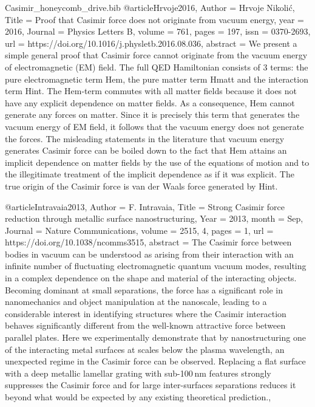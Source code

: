 \documentclass[twoside, 10pt]{article}
\def\myfilename{Casimir_honeycomb_drive}
\begin{document}
\begin{multicols}{2}
\begin{filecontents}{\myfilename.bib}
@article{Hrvoje2016,
    Author = {Hrvoje Nikolić},
    Title = {Proof that Casimir force does not originate from vacuum energy},
    year = {2016},
    Journal = {Physics Letters B},
    volume = {761},
    pages = {197},
    issn = {0370-2693},
    url = {https://doi.org/10.1016/j.physletb.2016.08.036},
    abstract = {We present a simple general proof that Casimir force cannot originate from the vacuum energy of electromagnetic (EM) field. The full QED Hamiltonian consists of 3 terms: the pure electromagnetic term Hem, the pure matter term Hmatt and the interaction term Hint. The Hem-term commutes with all matter fields because it does not have any explicit dependence on matter fields. As a consequence, Hem cannot generate any forces on matter. Since it is precisely this term that generates the vacuum energy of EM field, it follows that the vacuum energy does not generate the forces. The misleading statements in the literature that vacuum energy generates Casimir force can be boiled down to the fact that Hem attains an implicit dependence on matter fields by the use of the equations of motion and to the illegitimate treatment of the implicit dependence as if it was explicit. The true origin of the Casimir force is van der Waals force generated by Hint.}
}




@article{Intravaia2013,
    Author = {F. Intravaia},
    Title = {Strong Casimir force reduction through metallic surface nanostructuring},
    Year = {2013},
    month = {Sep},
    Journal = {Nature Communications},
    volume = {2515, 4},
    pages = {1},
    url = {https://doi.org/10.1038/ncomms3515},
    abstract = {The Casimir force between bodies in vacuum can be understood as arising from their interaction with an infinite number of fluctuating electromagnetic quantum vacuum modes, resulting in a complex dependence on the shape and material of the interacting objects. Becoming dominant at small separations, the force has a significant role in nanomechanics and object manipulation at the nanoscale, leading to a considerable interest in identifying structures where the Casimir interaction behaves significantly different from the well-known attractive force between parallel plates. Here we experimentally demonstrate that by nanostructuring one of the interacting metal surfaces at scales below the plasma wavelength, an unexpected regime in the Casimir force can be observed. Replacing a flat surface with a deep metallic lamellar grating with sub-100 nm features strongly suppresses the Casimir force and for large inter-surfaces separations reduces it beyond what would be expected by any existing theoretical prediction.},
}


\end{filecontents}
\end{multicols}
\end{document}
